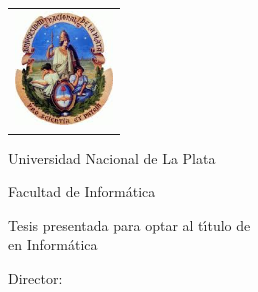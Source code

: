 \newcommand{\HRule}{\rule{\linewidth}{0.2mm}}
%
\thispagestyle{empty}

\begin{center}\leavevmode

\vspace{-2cm}

\begin{tabular}{l}
\includegraphics[width=2.6cm]{img/logo-unlp.jpeg}
\end{tabular}


{\large \sc Universidad Nacional de La Plata

Facultad de Informática
}

\vspace{3.0cm}


{\huge\bf \tituloTesis}

\vspace{2cm}
% 
{\large Tesis presentada para optar al t\'{\i}tulo de\\
\titulo en Informática}

\vspace{2cm}

{\Large \autor}

\end{center}

\vfill

{\large

{Director: \director}

\vspace{.2cm}


\vspace{.2cm}

\lugar
}

\newpage\thispagestyle{empty}

